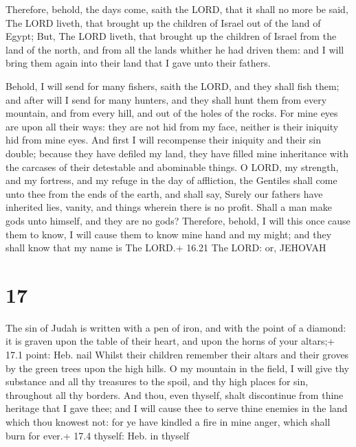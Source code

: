  Therefore, behold, the days come, saith the LORD, that
it shall no more be said, The LORD liveth, that brought up the children
of Israel out of the land of Egypt;  But, The LORD liveth,
that brought up the children of Israel from the land of the north, and
from all the lands whither he had driven them: and I will bring them
again into their land that I gave unto their fathers.

 Behold, I will send for many fishers, saith the LORD,
and they shall fish them; and after will I send for many hunters, and
they shall hunt them from every mountain, and from every hill, and out
of the holes of the rocks.  For mine eyes are upon all
their ways: they are not hid from my face, neither is their iniquity hid
from mine eyes.  And first I will recompense their iniquity
and their sin double; because they have defiled my land, they have
filled mine inheritance with the carcases of their detestable and
abominable things.  O LORD, my strength, and my fortress,
and my refuge in the day of affliction, the Gentiles shall come unto
thee from the ends of the earth, and shall say, Surely our fathers have
inherited lies, vanity, and things wherein there is no profit.
 Shall a man make gods unto himself, and they are no gods?
 Therefore, behold, I will this once cause them to know, I
will cause them to know mine hand and my might; and they shall know that
my name is The LORD.+ 16.21 The LORD: or, JEHOVAH

\hypertarget{section-16}{%
\section{17}\label{section-16}}

 The sin of Judah is written with a pen of iron, and with
the point of a diamond: it is graven upon the table of their heart, and
upon the horns of your altars;+ 17.1 point: Heb. nail 
Whilst their children remember their altars and their groves by the
green trees upon the high hills.  O my mountain in the
field, I will give thy substance and all thy treasures to the spoil, and
thy high places for sin, throughout all thy borders.  And
thou, even thyself, shalt discontinue from thine heritage that I gave
thee; and I will cause thee to serve thine enemies in the land which
thou knowest not: for ye have kindled a fire in mine anger, which shall
burn for ever.+ 17.4 thyself: Heb. in thyself

